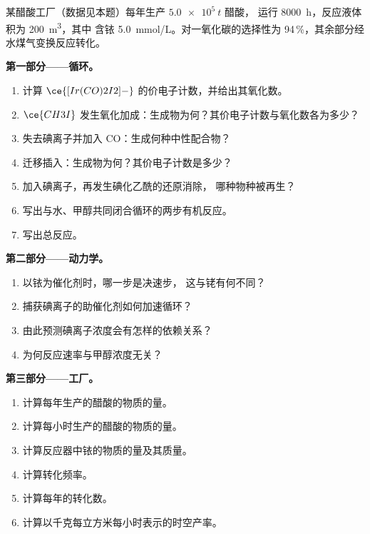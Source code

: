 \begin{problem}
\label{pb:b3:homogeneous-catalysis:1}
某醋酸工厂（数据见本题）每年生产 $\qty{5.0e5}{t}$ 醋酸，
运行 \qty{8000}{h}，反应液体积为 \qty{200}{m^3}，其中
含铱 \qty{5.0}{mmol/L}。对一氧化碳的选择性为 94\,\%，其余部分经
水煤气变换反应转化。

\medskip\noindent\textbf{第一部分——循环。}
\begin{enumerate}
  \item 计算 $\ce{[Ir(CO)2I2]-}$ 的价电子计数，并给出其氧化数。
  \item $\ce{CH3I}$ 发生氧化加成：生成物为何？其价电子计数与氧化数各为多少？
  \item 失去碘离子并加入 CO：生成何种中性配合物？
  \item 迁移插入：生成物为何？其价电子计数是多少？
  \item 加入碘离子，再发生碘化乙酰的还原消除，
        哪种物种被再生？
  \item 写出与水、甲醇共同闭合循环的两步有机反应。
  \item 写出总反应。
\end{enumerate}

\medskip\noindent\textbf{第二部分——动力学。}
\begin{enumerate}[resume]
  \item 以铱为催化剂时，哪一步是决速步，
        这与铑有何不同？
  \item 捕获碘离子的助催化剂如何加速循环？
  \item 由此预测碘离子浓度会有怎样的依赖关系？
  \item 为何反应速率与甲醇浓度无关？
\end{enumerate}

\medskip\noindent\textbf{第三部分——工厂。}
\begin{enumerate}[resume]
  \item 计算每年生产的醋酸的物质的量。
  \item 计算每小时生产的醋酸的物质的量。
  \item 计算反应器中铱的物质的量及其质量。
  \item 计算转化频率。
  \item 计算每年的转化数。
  \item 计算以千克每立方米每小时表示的时空产率。
\end{enumerate}


\end{problem}
